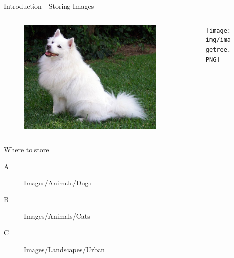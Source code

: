 \begin{frame}{Introduction - Storing Images}
\begin{columns}
    \begin{column}{0.47\textwidth}
    \begin{figure}
        \centering
        \includegraphics[width=\textwidth,height=0.45\textheight,keepaspectratio]{img/dog.jpg}
        \label{fig:my_label}
    \end{figure}
    \end{column}
    \begin{column}{0.47\textwidth}
    \begin{figure}
        \centering
        \texttt{[image: img/imagetree.PNG]}
        \label{fig:my_label}
    \end{figure}
    \end{column}
\end{columns} 
\begin{block}{Where to store}
\begin{description}
    \item [A] Images/Animals/Dogs
    \item [B] Images/Animals/Cats
    \item [C] Images/Landscapes/Urban
\end{description}
\end{block}
\end{frame}

